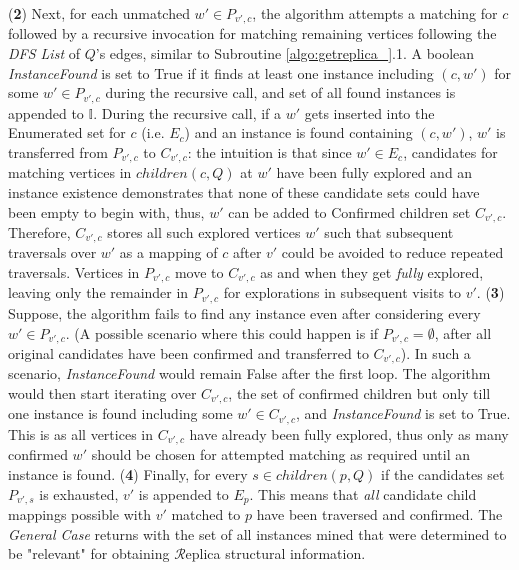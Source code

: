 (\textbf{2}) Next, for each unmatched $w'\in P_{v',c}$, the algorithm attempts a
matching for $c$ followed by a recursive invocation for matching remaining
vertices following the \emph{DFS List} of $Q$'s edges, similar to Subroutine
\ref{algo:getreplica_}.1. A boolean \emph{InstanceFound} is set to {\sf True} if
it finds at least one instance including $(c,w')$ for some $w'\in P_{v',c}$
during the recursive call, and set of all found instances is appended to
$\mathbb{I}$. During the recursive call, if a $w'$ gets inserted into the
Enumerated set for $c$ (i.e. $E_c$) and an instance is found containing
$(c,w')$, $w'$ is transferred from $P_{v',c}$ to $C_{v',c}$: the intuition is
that since $w'\in E_c$, candidates for matching vertices in $children(c, Q)$ at
$w'$ have been fully explored and an instance existence demonstrates that none
of these candidate sets could have been empty to begin with, thus, $w'$ can be
added to Confirmed children set $C_{v',c}$. Therefore, $C_{v',c}$ stores all
such explored vertices $w'$ such that subsequent traversals over $w'$ as a
mapping of $c$ after $v'$ could be avoided to reduce repeated traversals.
Vertices in $P_{v',c}$ move to $C_{v',c}$ as and when they get \emph{fully}
explored, leaving only the remainder in $P_{v',c}$ for explorations in
subsequent visits to $v'$. (\textbf{3}) Suppose, the algorithm fails to find any
instance even after considering every $w'\in P_{v',c}$. (A possible
scenario where this could happen is if $P_{v',c}=\emptyset$, after all original
candidates have been confirmed and transferred to $C_{v',c}$). In such a
scenario, \emph{InstanceFound} would remain {\sf False} after the first loop.
The algorithm would then start iterating over $C_{v',c}$, the set of confirmed
children but only till one instance is found including some $w' \in
C_{v',c}$, and \emph{InstanceFound} is set to {\sf True}. This is as all vertices in
$C_{v',c}$ have already been fully explored, thus only as many confirmed $w'$
should be chosen for attempted matching as required until an instance is found.
(\textbf{4}) Finally, for every $s\in children(p, Q)$ if the candidates
set $P_{v',s}$ is exhausted, $v'$ is appended to $E_{p}$. This means that
\textit{all} candidate child mappings possible with $v'$ matched to $p$ have
been traversed and confirmed. The \textit{General Case} returns with the set of
all instances mined that were determined to be "relevant" for obtaining
$\mathcal{R}$eplica structural information.

